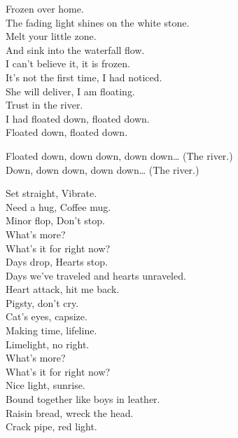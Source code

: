 Frozen over home. \\
The fading light shines on the white stone. \\
Melt your little zone. \\
And sink into the waterfall flow. \\

I can't believe it, it is frozen. \\
It's not the first time, I had noticed. \\
She will deliver, I am floating. \\
Trust in the river. \\
I had floated down, floated down. \\
Floated down, floated down. \\


Floated down, down down, down down… (The river.) \\
Down, down down, down down… (The river.) \\




Set straight, Vibrate. \\
Need a hug, Coffee mug. \\
Minor flop, Don't stop. \\

What's more? \\
What's it for right now? \\

Days drop, Hearts stop. \\
Days we've traveled and hearts unraveled. \\
Heart attack, hit me back. \\
Pigsty, don't cry. \\

Cat's eyes, capsize. \\
Making time, lifeline. \\
Limelight, no right. \\

What's more? \\
What's it for right now? \\

Nice light, sunrise. \\
Bound together like boys in leather. \\
Raisin bread, wreck the head. \\
Crack pipe, red light. \\

